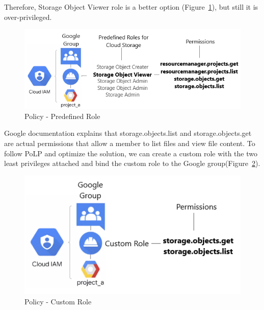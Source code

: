 Therefore, Storage Object Viewer role is a better option (Figure~\ref{fig:sto-pre}), but still it is over-privileged. 
\begin{figure}[!h]
  \centering
  \includegraphics[width=\linewidth]{pic/sto-pre}
  \caption {Policy - Predefined Role}
   \label{fig:sto-pre}
\end{figure}
Google documentation explains that storage.objects.list and storage.objects.get are actual permissions that allow a member to list files and view file content. To follow PoLP and optimize the solution, we can create a custom role with the two least privileges attached and bind the custom role to the Google group(Figure~\ref{fig:sto-cus}).
\begin{figure}[!h]
  \centering
  \includegraphics[width=\linewidth]{pic/sto-cus}
  \caption {Policy - Custom Role}
   \label{fig:sto-cus}
\end{figure}